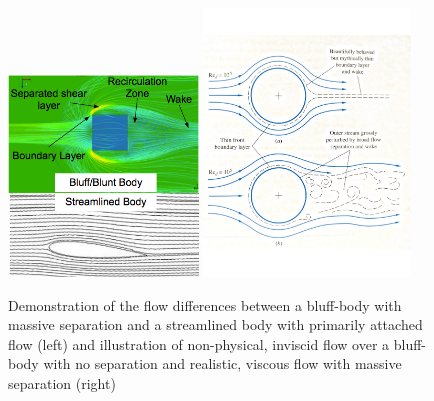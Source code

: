 \documentclass[journal]{new-aiaa}
\begin{document}
\begin{figure}[H]
\begin{center}
\includegraphics[width=0.45\textwidth]{Images/logan/bluntVSstreamline.png}
\includegraphics[width=0.49\textwidth]{Images/logan/white2011fluid_BluffBodyInviscidVSViscous.pdf}
\caption{ Demonstration of the flow differences between a bluff-body with massive separation \cite{richards2015modelling} and a streamlined body with primarily attached flow (left) and illustration of non-physical, inviscid flow over a bluff-body with no separation and realistic, viscous flow with massive separation (right) \cite{white2011fluid} }
\label{fig:bluffvsstreamlined}
\end{center}
\end{figure}
\end{document}
